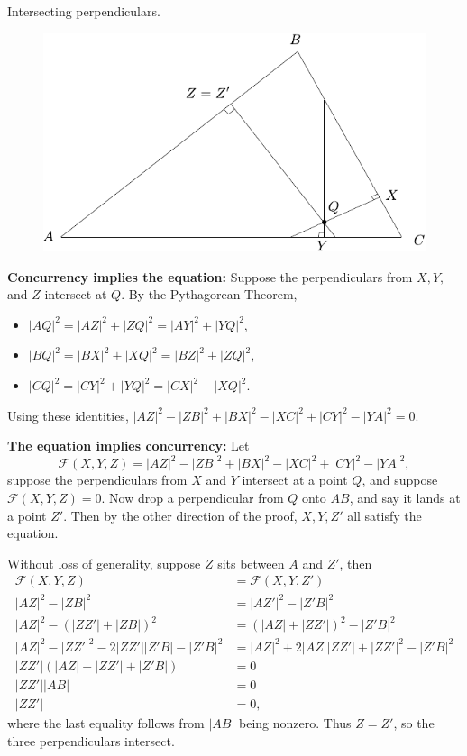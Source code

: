 \documentclass[twoside,10pt]{article}
\begin{document}
\newpage

\begin{exer}[1.129]
Intersecting perpendiculars.
\end{exer}

\begin{figure}[H]
	\centering
	\includegraphics[scale=1]{fig/129.pdf}
\end{figure}

\textbf{Concurrency implies the equation:} Suppose the perpendiculars from $X,Y,$ and $Z$ intersect at $Q$. By the Pythagorean Theorem,
\begin{itemize}
	\item $|AQ|^2 = |AZ|^2+|ZQ|^2 = |AY|^2+|YQ|^2$,
	\item $|BQ|^2 = |BX|^2+|XQ|^2 = |BZ|^2+|ZQ|^2$,
	\item $|CQ|^2 = |CY|^2+|YQ|^2 = |CX|^2+|XQ|^2$.
\end{itemize}
Using these identities, $|AZ|^2-|ZB|^2+\left| BX \right|^2-|XC|^2+|CY|^2-|YA|^2=0$.
\vspace{5mm}

\textbf{The equation implies concurrency:} Let
\[
	\mathcal{F}(X,Y,Z) = |AZ|^2-|ZB|^2+\left| BX \right|^2-|XC|^2+|CY|^2-|YA|^2,
\] suppose the perpendiculars from $X$ and $Y$ intersect at a point $ Q$, and suppose $\mathcal{F}(X,Y,Z)=0$. Now drop a perpendicular from $Q$ onto $AB$, and say it lands at a point $Z'$. Then by the other direction of the proof, $X,Y,Z'$ all satisfy the equation.

Without loss of generality, suppose $Z$ sits between $ A$ and $Z'$, then
\begin{align*}
	\mathcal{F}(X,Y,Z) &= \mathcal{F}(X,Y,Z') \\
	|AZ|^2 - |ZB|^2 &= |AZ'|^2 - |Z'B|^2 \\
	|AZ|^2 - (|ZZ'|+|ZB|)^2 &= (|AZ|+|ZZ'|)^2 - |Z'B|^2 \\
	|AZ|^2 - |ZZ'|^2 - 2|ZZ'| |Z'B| - |Z'B|^2 &= |AZ|^2 + 2|AZ| |ZZ'| + |ZZ'|^2 - |Z'B|^2 \\
	|ZZ'|( |AZ|+|ZZ'|+|Z'B|) &= 0 \\
	|ZZ'| |AB| &= 0 \\
	|ZZ'| &= 0,
\end{align*}
where the last equality follows from $|AB|$ being nonzero. Thus $Z=Z'$, so the three perpendiculars intersect.


\newpage
\end{document}
